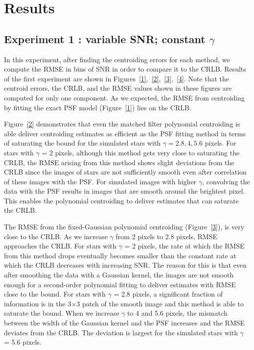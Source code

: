 \documentclass[onecolumn]{aastex61}
\newcommand{\todo}[1]{{\textcolor{dred}{ #1}}}
\begin{document}
\section{Results}\label{sec:result}

\todo{\subsection{Experiment 1 : variable SNR; constant $\gamma$}}
   
In this experiment, after finding the centroiding errors for each method,
we compute the RMSE in bins of SNR in order to compare it to the CRLB. 
Results of the first experiment are shown in Figures~\ref{1},~\ref{2},~\ref{3},~\ref{4}. \todo{Note that the centroid errors, the CRLB, and the RMSE values shown in these figures are computed for only one component. As we expected, the RMSE from centroiding by fitting the exact PSF model (Figure~\ref{1}) lies on the CRLB.} 

\todo{Figure~\ref{2} demonstrates that even the matched filter polynomial centroiding is able deliver centroiding estimates as efficient as the PSF fitting method in terms of saturating the bound for the simulated stars with $\gamma = 2.8, 4, 5.6$ pixels. For stars with $\gamma$ = 2 pixels, although this method gets very close to saturating the CRLB, the RMSE arising from this method shows slight deviations from the CRLB since the images of stars are not sufficiently smooth even after correlation of these images with the PSF. For simulated images with higher $\gamma$, convolving the data with the PSF results in images that are smooth around the brightest pixel. This enables the polynomial centroiding to deliver estimates that can saturate the CRLB.}

\todo{The RMSE from the fixed-Gaussian polynomial centroiding (Figure~\ref{3}),
is very close to the CRLB. As we increase $\gamma$ from 2 pixels to 2.8 pixels, RMSE approaches the CRLB. For stars with $\gamma$ = 2 pixels, the rate at which the RMSE from this method drops
eventually becomes smaller than the constant rate at which the CRLB
decreases with increasing SNR. The reason for this is that even after smoothing
the data with a Gaussian kernel, the images are not smooth enough
for a second-order polynomial fitting to deliver estimates with RMSE close to the bound. For stars with $\gamma$ = 2.8 pixels, a significant fraction of information is in the 3$\times$3 patch of the smooth image and this method is able to saturate the bound. When we increase $\gamma$ to 4 and 5.6 pixels, the mismatch between the width of the Gaussian kernel and the PSF increases and the RMSE deviates from the CRLB. The deviation is largest for the simulated stars with $\gamma$ = 5.6 pixels.}
\end{document}

